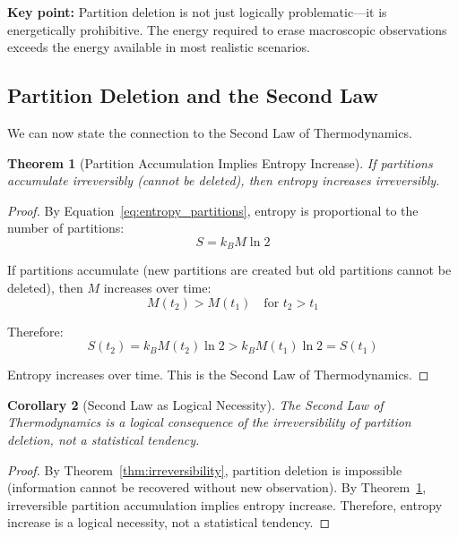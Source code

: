 \documentclass[twocolumn,10pt]{article}
\newtheorem{theorem}{Theorem}[section]
\newtheorem{corollary}[theorem]{Corollary}
\theoremstyle{definition}
\theoremstyle{remark}
\begin{document}
\noindent\textbf{Key point:} Partition deletion is not just logically problematic—it is energetically prohibitive. The energy required to erase macroscopic observations exceeds the energy available in most realistic scenarios.

\subsection{Partition Deletion and the Second Law}

We can now state the connection to the Second Law of Thermodynamics.

\begin{theorem}[Partition Accumulation Implies Entropy Increase]
\label{thm:partition_accumulation}
If partitions accumulate irreversibly (cannot be deleted), then entropy increases irreversibly.
\end{theorem}

\begin{proof}
By Equation~\ref{eq:entropy_partitions}, entropy is proportional to the number of partitions:
\begin{equation}
S = k_B M \ln 2
\end{equation}

If partitions accumulate (new partitions are created but old partitions cannot be deleted), then $M$ increases over time:
\begin{equation}
M(t_2) > M(t_1) \quad \text{for } t_2 > t_1
\end{equation}

Therefore:
\begin{equation}
S(t_2) = k_B M(t_2) \ln 2 > k_B M(t_1) \ln 2 = S(t_1)
\end{equation}

Entropy increases over time. This is the Second Law of Thermodynamics.
\end{proof}

\begin{corollary}[Second Law as Logical Necessity]
\label{cor:second_law_logical}
The Second Law of Thermodynamics is a logical consequence of the irreversibility of partition deletion, not a statistical tendency.
\end{corollary}

\begin{proof}
By Theorem~\ref{thm:irreversibility}, partition deletion is impossible (information cannot be recovered without new observation). By Theorem~\ref{thm:partition_accumulation}, irreversible partition accumulation implies entropy increase. Therefore, entropy increase is a logical necessity, not a statistical tendency.
\end{proof}
\end{document}

